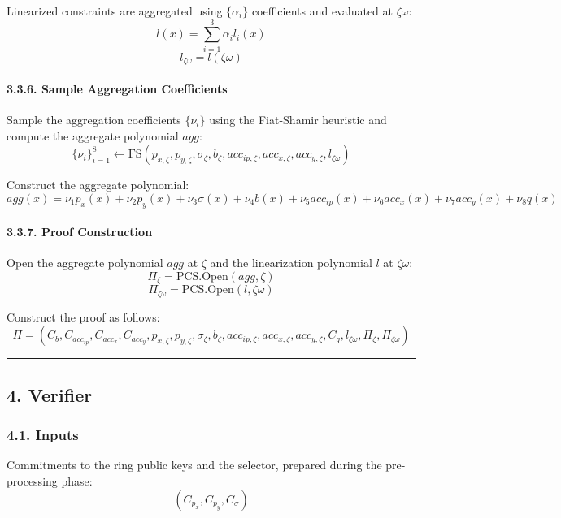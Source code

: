 \documentclass[
]{article}
\begin{document}
Linearized constraints are aggregated using \(\{\alpha_i\}\)
coefficients and evaluated at \(\zeta \omega\):
\[l(x)=\sum_{i=1}^3\alpha_i l_i(x)\] \[l_{\zeta\omega}=l(\zeta\omega)\]

\paragraph{3.3.6. Sample Aggregation
Coefficients}\label{sample-aggregation-coefficients}

Sample the aggregation coefficients \(\{\nu_i\}\) using the Fiat-Shamir
heuristic and compute the aggregate polynomial \(agg\):
\[\{\nu_i\}_{i=1}^8 \leftarrow \text{FS}(p_{x,\zeta}, p_{y,\zeta}, \sigma_\zeta, b_\zeta, acc_{ip,\zeta}, acc_{x,\zeta}, acc_{y,\zeta}, l_{\zeta\omega})\]

Construct the aggregate polynomial:
\[agg(x)=\nu_1p_x(x)+\nu_2p_y(x)+\nu_3\sigma(x)+\nu_4b(x)+\nu_5acc_{ip}(x)+\nu_6acc_x(x)+\nu_7acc_y(x)+\nu_8q(x)\]

\paragraph{3.3.7. Proof Construction}\label{proof-construction}

Open the aggregate polynomial \(agg\) at \(\zeta\) and the linearization
polynomial \(l\) at \(\zeta\omega\):
\[\Pi_\zeta = \text{PCS.Open}(agg,\zeta)\]
\[\Pi_{\zeta\omega} = \text{PCS.Open}(l,\zeta\omega)\]

Construct the proof as follows:
\[\Pi=(C_b,C_{acc_{ip}},C_{acc_x},C_{acc_y},p_{x,\zeta},p_{y,\zeta},\sigma_\zeta,b_\zeta,acc_{ip,\zeta},acc_{x,\zeta},acc_{y,\zeta},C_q,l_{\zeta\omega},\Pi_\zeta,\Pi_{\zeta\omega})\]

\begin{center}\rule{0.5\linewidth}{0.5pt}\end{center}

\subsection{4. Verifier}\label{verifier}

\subsubsection{4.1. Inputs}\label{inputs}

Commitments to the ring public keys and the selector, prepared during
the pre-processing phase: \[(C_{p_x}, C_{p_y}, C_\sigma)\]
\end{document}
